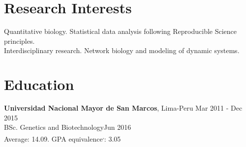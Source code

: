 \documentclass[margin,line]{res}
\begin{document}
\address{Calle Tambo Huascar 201, San Miguel, Lima-Peru}
\address{\textit{contact:} avallecam@gmail.com or (+51)950951722}

\begin{resume}

\vspace*{.15in}

\section{\sc Research Interests}%


Quantitative biology. Statistical data analysis following Reproducible Science principles.\\
Interdisciplinary research. Network biology and modeling of dynamic systems.\\%



\section{\sc Education}
{\bf Universidad Nacional Mayor de San Marcos}, Lima-Peru \hfill Mar 2011 - Dec 2015\\
BSc. Genetics and Biotechnology\hfill Jun 2016\\
Average: 14.09. GPA equivalence\footnotemark\textsuperscript{,}\footnotemark: 3.05\\%


\end{resume}
\end{document}
